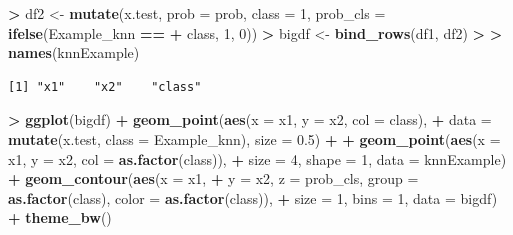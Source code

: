 \documentclass[]{krantz}
\makeatletter
\newenvironment{Shaded}{\begin{snugshade}}{\end{snugshade}}
\newcommand{\DataTypeTok}[1]{\textcolor[rgb]{0.27,0.27,0.27}{#1}}
\newcommand{\DecValTok}[1]{\textcolor[rgb]{0.06,0.06,0.06}{#1}}
\newcommand{\ErrorTok}[1]{\textcolor[rgb]{0.14,0.14,0.14}{\textbf{#1}}}
\newcommand{\FloatTok}[1]{\textcolor[rgb]{0.06,0.06,0.06}{#1}}
\newcommand{\KeywordTok}[1]{\textcolor[rgb]{0.27,0.27,0.27}{\textbf{#1}}}
\newcommand{\NormalTok}[1]{#1}
\newcommand{\OperatorTok}[1]{\textcolor[rgb]{0.43,0.43,0.43}{\textbf{#1}}}
\newcommand{\StringTok}[1]{\textcolor[rgb]{0.5,0.5,0.5}{#1}}
\newenvironment{kframe}{%
\medskip{}
\setlength{\fboxsep}{.8em}
 \def\at@end@of@kframe{}%
 \ifinner\ifhmode%
  \def\at@end@of@kframe{\end{minipage}}%
  \begin{minipage}{\columnwidth}%
 \fi\fi%
 \def\FrameCommand##1{\hskip\@totalleftmargin \hskip-\fboxsep
 \colorbox{shadecolor}{##1}\hskip-\fboxsep
     \hskip-\linewidth \hskip-\@totalleftmargin \hskip\columnwidth}%
 \MakeFramed {\advance\hsize-\width
   \@totalleftmargin\z@ \linewidth\hsize
   \@setminipage}}%
 {\par\unskip\endMakeFramed%
 \at@end@of@kframe}
\renewenvironment{Shaded}{\begin{kframe}}{\end{kframe}}
\makeatother
\begin{document}
\begin{Shaded}
\begin{Highlighting}[]
\OperatorTok{>}\StringTok{ }\NormalTok{df2 <-}\StringTok{ }\KeywordTok{mutate}\NormalTok{(x.test, }\DataTypeTok{prob =}\NormalTok{ prob, }\DataTypeTok{class =} \DecValTok{1}\NormalTok{, }\DataTypeTok{prob_cls =} \KeywordTok{ifelse}\NormalTok{(Example_knn }\OperatorTok{==}\StringTok{ }
\OperatorTok{+}\StringTok{   }\NormalTok{class, }\DecValTok{1}\NormalTok{, }\DecValTok{0}\NormalTok{))}
\OperatorTok{>}\StringTok{ }\NormalTok{bigdf <-}\StringTok{ }\KeywordTok{bind_rows}\NormalTok{(df1, df2)}
\OperatorTok{>}\StringTok{ }
\ErrorTok{>}\StringTok{ }\KeywordTok{names}\NormalTok{(knnExample)}
\end{Highlighting}
\end{Shaded}

\begin{verbatim}
[1] "x1"    "x2"    "class"
\end{verbatim}

\begin{Shaded}
\begin{Highlighting}[]
\OperatorTok{>}\StringTok{ }\KeywordTok{ggplot}\NormalTok{(bigdf) }\OperatorTok{+}\StringTok{ }\KeywordTok{geom_point}\NormalTok{(}\KeywordTok{aes}\NormalTok{(}\DataTypeTok{x =}\NormalTok{ x1, }\DataTypeTok{y =}\NormalTok{ x2, }\DataTypeTok{col =}\NormalTok{ class), }
\OperatorTok{+}\StringTok{   }\DataTypeTok{data =} \KeywordTok{mutate}\NormalTok{(x.test, }\DataTypeTok{class =}\NormalTok{ Example_knn), }\DataTypeTok{size =} \FloatTok{0.5}\NormalTok{) }\OperatorTok{+}\StringTok{ }
\OperatorTok{+}\StringTok{   }\KeywordTok{geom_point}\NormalTok{(}\KeywordTok{aes}\NormalTok{(}\DataTypeTok{x =}\NormalTok{ x1, }\DataTypeTok{y =}\NormalTok{ x2, }\DataTypeTok{col =} \KeywordTok{as.factor}\NormalTok{(class)), }
\OperatorTok{+}\StringTok{     }\DataTypeTok{size =} \DecValTok{4}\NormalTok{, }\DataTypeTok{shape =} \DecValTok{1}\NormalTok{, }\DataTypeTok{data =}\NormalTok{ knnExample) }\OperatorTok{+}\StringTok{ }\KeywordTok{geom_contour}\NormalTok{(}\KeywordTok{aes}\NormalTok{(}\DataTypeTok{x =}\NormalTok{ x1, }
\OperatorTok{+}\StringTok{   }\DataTypeTok{y =}\NormalTok{ x2, }\DataTypeTok{z =}\NormalTok{ prob_cls, }\DataTypeTok{group =} \KeywordTok{as.factor}\NormalTok{(class), }\DataTypeTok{color =} \KeywordTok{as.factor}\NormalTok{(class)), }
\OperatorTok{+}\StringTok{   }\DataTypeTok{size =} \DecValTok{1}\NormalTok{, }\DataTypeTok{bins =} \DecValTok{1}\NormalTok{, }\DataTypeTok{data =}\NormalTok{ bigdf) }\OperatorTok{+}\StringTok{ }\KeywordTok{theme_bw}\NormalTok{()}
\end{Highlighting}
\end{Shaded}
\end{document}
